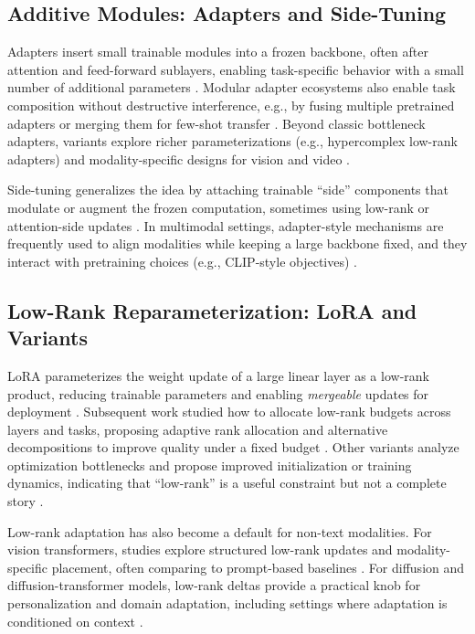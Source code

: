 \documentclass[conference]{IEEEtran}
\begin{document}
\subsection{Additive Modules: Adapters and Side-Tuning}
Adapters insert small trainable modules into a frozen backbone, often after attention and feed-forward sublayers, enabling task-specific behavior with a small number of additional parameters \cite{houlsby2019parameter,pfeiffer2020adapterhub}. Modular adapter ecosystems also enable task composition without destructive interference, e.g., by fusing multiple pretrained adapters or merging them for few-shot transfer \cite{pfeiffer2020adapterfusion,he2023mera}. Beyond classic bottleneck adapters, variants explore richer parameterizations (e.g., hypercomplex low-rank adapters) and modality-specific designs for vision and video \cite{mahabadi2021compacter,pan2022st,xin2024parameter}.

Side-tuning generalizes the idea by attaching trainable ``side'' components that modulate or augment the frozen computation, sometimes using low-rank or attention-side updates \cite{tang2024low}. In multimodal settings, adapter-style mechanisms are frequently used to align modalities while keeping a large backbone fixed, and they interact with pretraining choices (e.g., CLIP-style objectives) \cite{radford2021learning,prottasha2025peft}.

\subsection{Low-Rank Reparameterization: LoRA and Variants}
LoRA parameterizes the weight update of a large linear layer as a low-rank product, reducing trainable parameters and enabling \emph{mergeable} updates for deployment \cite{hu2021lora}. Subsequent work studied how to allocate low-rank budgets across layers and tasks, proposing adaptive rank allocation and alternative decompositions to improve quality under a fixed budget \cite{zhang2023adalora,liu2024dora,si2024task}. Other variants analyze optimization bottlenecks and propose improved initialization or training dynamics, indicating that ``low-rank'' is a useful constraint but not a complete story \cite{meng2024periodiclora,wang2024lora,hu2024computational}.

Low-rank adaptation has also become a default for non-text modalities. For vision transformers, studies explore structured low-rank updates and modality-specific placement, often comparing to prompt-based baselines \cite{wang2025vision,zhong2025serial,chen2022adaptformer}. For diffusion and diffusion-transformer models, low-rank deltas provide a practical knob for personalization and domain adaptation, including settings where adaptation is conditioned on context \cite{rombach2021high,huang2024in}.
\end{document}
